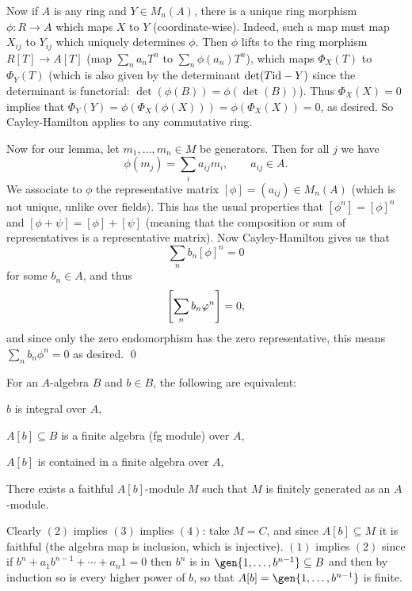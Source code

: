     Now if $A$ is any ring and $Y\in M_n(A)$, there is a unique ring morphism $\phi\colon R\to A$ which maps $X$ to $Y$ (coordinate-wise).
    Indeed, such a map must map $X_{ij}$ to $Y_{ij}$ which uniquely determines $\phi$.
    Then $\phi$ lifts to the ring morphism $R[T]\to A[T]$ (map $\sum_na_nT^n$ to $\sum_n\phi(a_n)T^n$), which maps $\Phi_X(T)$ to $\Phi_Y(T)$ (which is also given by the determinant $\det(T{\rm id}-Y)$ since the determinant
    is functorial: $\det(\phi(B))=\phi(\det(B))$).
    Thus $\Phi_X(X)=0$ implies that $\Phi_Y(Y)=\phi(\Phi_X(\phi(X)))=\phi(\Phi_X(X))=0$, as desired.
    So Cayley-Hamilton applies to any commutative ring.

    Now for our lemma, let $m_1,\dots,m_n\in M$ be generators.
    Then for all $j$ we have
    $$ \phi(m_j) = \sum_i a_{ij}m_i ,\qquad a_{ij}\in A . $$
    We associate to $\phi$ the representative matrix $[\phi]=(a_{ij})\in M_n(A)$ (which is not unique, unlike over fields).
    This has the usual properties that $[\phi^n]=[\phi]^n$ and $[\phi+\psi]=[\phi]+[\psi]$ (meaning that the composition or sum of representatives is a representative matrix).
    Now Cayley-Hamilton gives us that
    $$ \sum_n b_n[\phi]^n = 0 $$
    for some $b_n\in A$, and thus
    $$ \mathopen{}\mathclose{\left[\sum_nb_n\varphi^n\right]} = 0 , $$
    and since only the zero endomorphism has the zero representative, this means $\sum_nb_n\phi^n=0$ as desired.
    \qed

\eproof

\bprop

    For an $A$-algebra $B$ and $b\in B$, the following are equivalent:
    \benum
        \item $b$ is integral over $A$,
        \item $A[b]\subseteq B$ is a finite algebra (fg module) over $A$,
        \item $A[b]$ is contained in a finite algebra over $A$,
        \item There exists a faithful $A[b]$-module $M$ such that $M$ is finitely generated as an $A$-module.
    \eenum

\eprop

\bproof

    Clearly $(2)$ implies $(3)$ implies $(4)$: take $M=C$, and since $A[b]\subseteq M$ it is faithful (the algebra map is inclusion, which is
    injective).
    $(1)$ implies $(2)$ since if $b^n+a_1b^{n-1}+\cdots+a_n1=0$ then $b^n$ is in $\gen{1,\dots,b^{n-1}}\subseteq B$ and then by induction so is
    every higher power of $b$, so that $A[b]=\gen{1,\dots,b^{n-1}}$ is finite.

